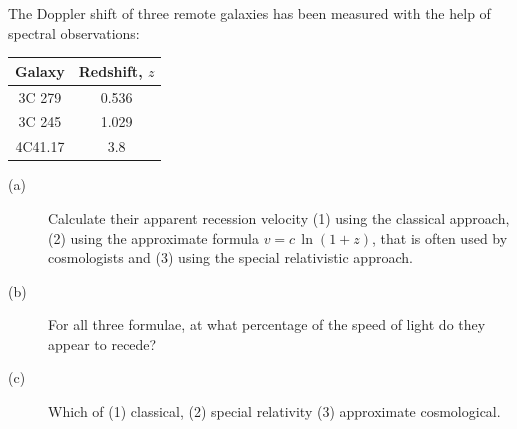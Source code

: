 The Doppler shift of three remote galaxies has been measured with the help of
spectral observations:

\begin{center}
\begin{tabular}{|c|c|}
\hline
Galaxy & Redshift, $z$ \\
\hline
3C 279 & 0.536 \\
\hline
3C 245 & 1.029 \\
\hline
4C41.17 & 3.8 \\
\hline
\end{tabular}
\end{center}

\begin{description}
\item[(a)] Calculate their apparent recession velocity (1) using the classical
  approach, (2) using the approximate formula $v = c\,\ln(1+z)$, that is often
  used by cosmologists and (3) using the special relativistic approach.
\item[(b)] For all three formulae, at what percentage of the speed of light do
  they appear to recede?
\item[(c)] Which of (1) classical, (2) special relativity (3) approximate
  cosmological.
\end{description}
